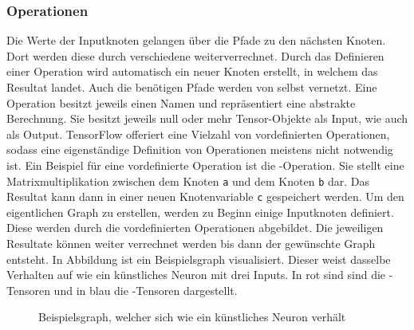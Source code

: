 \subsubsection{Operationen}
Die Werte der Inputknoten gelangen über die Pfade zu den nächsten Knoten. Dort
werden diese durch verschiedene  weiterverrechnet.
Durch das Definieren einer Operation wird automatisch ein neuer Knoten
erstellt, in welchem das Resultat landet. Auch die benötigen Pfade werden
von selbst vernetzt.
Eine Operation besitzt jeweils einen Namen und repräsentiert eine
abstrakte Berechnung. Sie besitzt jeweils null oder mehr Tensor-Objekte als
Input, wie auch als Output.
\para{}
TensorFlow offeriert eine Vielzahl von vordefinierten Operationen, sodass eine eigenständige
Definition von Operationen meistens nicht notwendig ist.
Ein Beispiel für eine vordefinierte Operation ist die
-Operation. Sie stellt eine Matrixmultiplikation zwischen
dem Knoten \texttt{a} und dem Knoten \texttt{b} dar.
Das Resultat kann dann in einer neuen Knotenvariable \texttt{c} gespeichert werden.
\para{}
Um den eigentlichen Graph zu erstellen, werden zu Beginn einige Inputknoten
definiert. Diese werden durch die vordefinierten Operationen abgebildet.
Die jeweiligen Resultate können weiter verrechnet werden bis dann der gewünschte Graph
entsteht.
\para{}
\bigskip
In Abbildung  ist ein Beispielsgraph visualisiert. Dieser
weist dasselbe Verhalten auf wie ein künstliches Neuron mit drei Inputs. In rot sind
sind die -Tensoren und in blau die -Tensoren dargestellt.

\begin{figure}[h!]
  \centering
  \caption{Beispielsgraph, welcher sich wie ein künstliches Neuron verhält}
  \label{fig:graph}
\end{figure}

